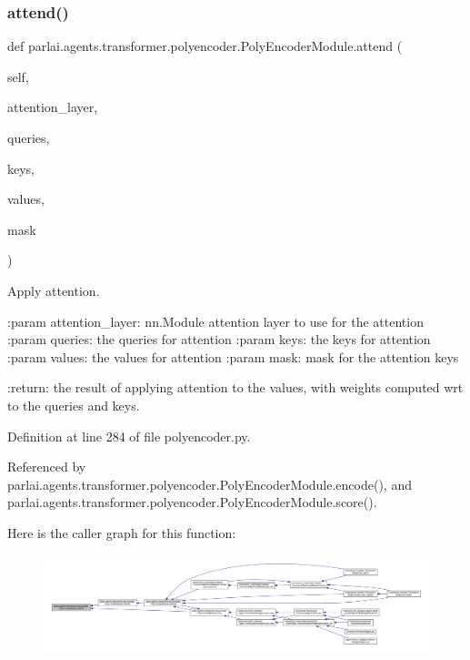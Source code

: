 \subsubsection{\texorpdfstring{attend()}{attend()}}
{\footnotesize\ttfamily def parlai.\+agents.\+transformer.\+polyencoder.\+Poly\+Encoder\+Module.\+attend (\begin{DoxyParamCaption}\item[{}]{self,  }\item[{}]{attention\+\_\+layer,  }\item[{}]{queries,  }\item[{}]{keys,  }\item[{}]{values,  }\item[{}]{mask }\end{DoxyParamCaption})}

\begin{DoxyVerb}Apply attention.

:param attention_layer:
    nn.Module attention layer to use for the attention
:param queries:
    the queries for attention
:param keys:
    the keys for attention
:param values:
    the values for attention
:param mask:
    mask for the attention keys

:return:
    the result of applying attention to the values, with weights computed
    wrt to the queries and keys.
\end{DoxyVerb}
 

Definition at line 284 of file polyencoder.\+py.



Referenced by parlai.\+agents.\+transformer.\+polyencoder.\+Poly\+Encoder\+Module.\+encode(), and parlai.\+agents.\+transformer.\+polyencoder.\+Poly\+Encoder\+Module.\+score().

Here is the caller graph for this function\+:
\nopagebreak
\begin{figure}[H]
\begin{center}
\leavevmode
\includegraphics[width=350pt]{classparlai_1_1agents_1_1transformer_1_1polyencoder_1_1PolyEncoderModule_a21343cb181ee148326166a8e32e9e3d6_icgraph}
\end{center}
\end{figure}
\mbox{\label{classparlai_1_1agents_1_1transformer_1_1polyencoder_1_1PolyEncoderModule_a54ca3cb24e2a0fbbfa7b3f145c7558ed}} 
